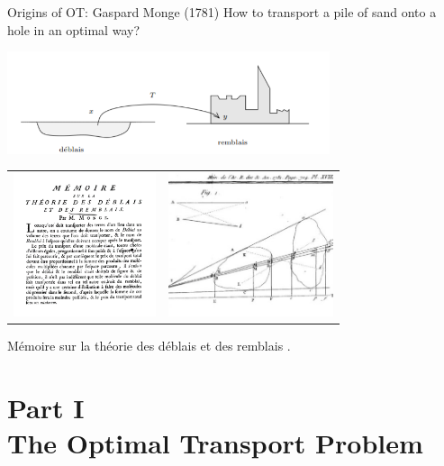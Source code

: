 \documentclass[pdf,aspectratio=169,10pt]{beamer}
\begin{document}
\begin{frame}{Origins of OT: Gaspard Monge (1781)}
How to transport a pile of sand onto a hole in an optimal way?

  \begin{center}
  \includegraphics[height=3cm]{../img/deblais}\vspace{0.2cm}
  \begin{tabular}{cc}
\includegraphics[height=4.2cm]{../img/monge0}& \includegraphics[height=4.2cm]{../img/monge1781} \\
  \end{tabular}
  
  \end{center}
{\tiny Mémoire sur la théorie des déblais et des remblais \cite{monge1781memoire}.}
\end{frame}



\section{Part I\\ The Optimal Transport Problem}


\begin{frame}
    \Large {}
\end{frame}
\end{document}
